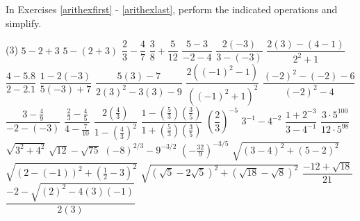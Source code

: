\label{ExercisesforAppRealNumberArithmetic}

In Exercises \ref{arithexfirst} - \ref{arithexlast}, perform the indicated operations and simplify.

\begin{tasks}(3)
\task $5 - 2 + 3$ \label{arithexfirst}
\task $5 - (2+3)$
\task $\dfrac{2}{3} - \dfrac{4}{7}$
\task $\dfrac{3}{8} + \dfrac{5}{12}$
\task $\dfrac{5-3}{-2-4}$
\task $\dfrac{2(-3)}{3 - (-3)}$
\task $\dfrac{2(3)-(4-1)}{2^2 + 1}$
\task $\dfrac{4 - 5.8}{2 - 2.1}$
\task $\dfrac{1 - 2(-3)}{5(-3) + 7}$
\task* $\dfrac{5(3) - 7}{2(3)^2-3(3)-9}$
\task $\dfrac{2((-1)^2-1)}{((-1)^2+1)^2}$
\task* $\dfrac{(-2)^2 - (-2) - 6}{(-2)^2 - 4}$
\task $\dfrac{3 - \frac{4}{9}}{-2 - (-3)}$
\task $\dfrac{\frac{2}{3} - \frac{4}{5}}{4 - \frac{7}{10}}$
\task $\dfrac{2\left(\frac{4}{3}\right)}{1 - \left(\frac{4}{3}\right)^2}$
\task $\dfrac{1 - \left(\frac{5}{3}\right)\left(\frac{3}{5}\right)}{1 + \left(\frac{5}{3}\right)\left(\frac{3}{5}\right)}$
\task $\left(\dfrac{2}{3}\right)^{-5}$
\task $3^{-1} - 4^{-2}$
\task $\dfrac{1 + 2^{-3}}{3 - 4^{-1}}$ 
\task $\dfrac{3\cdot 5^{100}}{12 \cdot 5^{98}}$
\task $\sqrt{3^2 + 4^2}$  
\task $\sqrt{12} - \sqrt{75}$  
\task $(-8)^{2/3} - 9^{-3/2}$ 
\task $\left(-\frac{32}{9}\right)^{-3/5}$
\task* $\sqrt{(3-4)^2 + (5-2)^2}$
\task* $\sqrt{(2 - (-1))^2 + \left(\frac{1}{2} - 3\right)^2}$ 
\task* $\sqrt{(\sqrt{5} - 2\sqrt{5})^2 + (\sqrt{18} - \sqrt{8})^2}$
\task $\dfrac{-12 + \sqrt{18}}{21}$
\task* $\dfrac{-2 - \sqrt{(2)^2 - 4(3)(-1)}}{2(3)}$  

\end{tasks}
